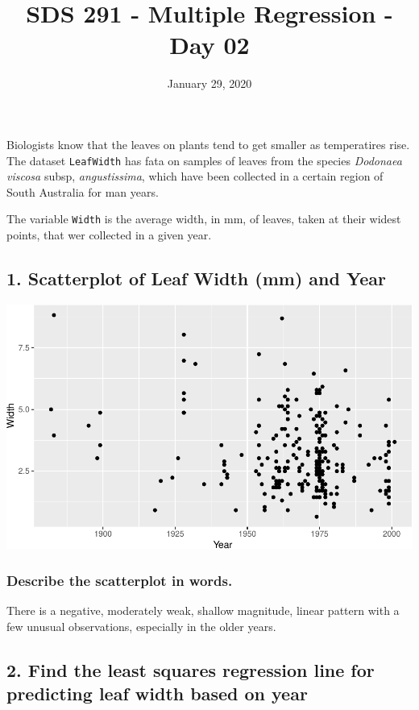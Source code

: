 \documentclass[]{article}
\title{SDS 291 - Multiple Regression - Day 02}
\author{}
\date{\vspace{-2.5em}January 29, 2020}
\begin{document}
\maketitle

Biologists know that the leaves on plants tend to get smaller as
temperatires rise. The dataset \texttt{LeafWidth} has fata on samples of
leaves from the species \emph{Dodonaea viscosa} subsp,
\emph{angustissima}, which have been collected in a certain region of
South Australia for man years.

The variable \texttt{Width} is the average width, in mm, of leaves,
taken at their widest points, that wer collected in a given year.

\hypertarget{scatterplot-of-leaf-width-mm-and-year}{%
\subsection{1. Scatterplot of Leaf Width (mm) and
Year}\label{scatterplot-of-leaf-width-mm-and-year}}

\includegraphics{02_Activity_AfterClass_files/figure-latex/scatter-1.pdf}

\hypertarget{describe-the-scatterplot-in-words.}{%
\subsubsection{Describe the scatterplot in
words.}\label{describe-the-scatterplot-in-words.}}

There is a negative, moderately weak, shallow magnitude, linear pattern
with a few unusual observations, especially in the older years.

\hypertarget{find-the-least-squares-regression-line-for-predicting-leaf-width-based-on-year}{%
\subsection{2. Find the least squares regression line for predicting
leaf width based on
year}\label{find-the-least-squares-regression-line-for-predicting-leaf-width-based-on-year}}
\end{document}
